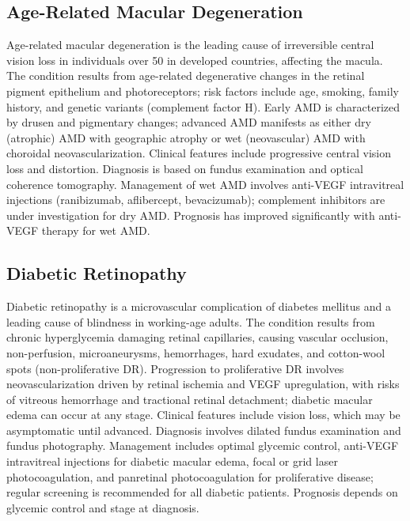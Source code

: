 \subsection{Age-Related Macular Degeneration}
\label{sec:Age-Related Macular Degeneration}
Age-related macular degeneration is the leading cause of irreversible central vision loss in individuals over 50 in developed countries, affecting the macula. The condition results from age-related degenerative changes in the retinal pigment epithelium and photoreceptors; risk factors include age, smoking, family history, and genetic variants (complement factor H). Early AMD is characterized by drusen and pigmentary changes; advanced AMD manifests as either dry (atrophic) AMD with geographic atrophy or wet (neovascular) AMD with choroidal neovascularization. Clinical features include progressive central vision loss and distortion. Diagnosis is based on fundus examination and optical coherence tomography. Management of wet AMD involves anti-VEGF intravitreal injections (ranibizumab, aflibercept, bevacizumab); complement inhibitors are under investigation for dry AMD. Prognosis has improved significantly with anti-VEGF therapy for wet AMD.

\subsection{Diabetic Retinopathy}
\label{sec:Diabetic Retinopathy}
Diabetic retinopathy is a microvascular complication of diabetes mellitus and a leading cause of blindness in working-age adults. The condition results from chronic hyperglycemia damaging retinal capillaries, causing vascular occlusion, non-perfusion, microaneurysms, hemorrhages, hard exudates, and cotton-wool spots (non-proliferative DR). Progression to proliferative DR involves neovascularization driven by retinal ischemia and VEGF upregulation, with risks of vitreous hemorrhage and tractional retinal detachment; diabetic macular edema can occur at any stage. Clinical features include vision loss, which may be asymptomatic until advanced. Diagnosis involves dilated fundus examination and fundus photography. Management includes optimal glycemic control, anti-VEGF intravitreal injections for diabetic macular edema, focal or grid laser photocoagulation, and panretinal photocoagulation for proliferative disease; regular screening is recommended for all diabetic patients. Prognosis depends on glycemic control and stage at diagnosis.

